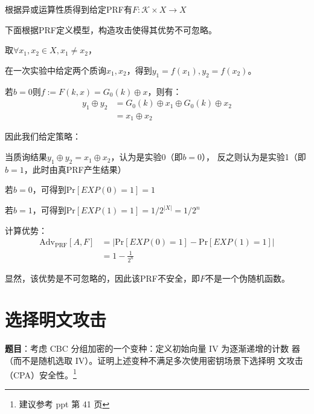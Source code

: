 \begin{Solution}
    根据异或运算性质得到给定PRF有$F:\mathcal{K}\times X \rightarrow X$
    
    下面根据PRF定义模型，构造攻击使得其优势不可忽略。

    取$\forall x_1, x_2 \in X, x_1 \neq x_2$，

    在一次实验中给定两个质询$x_1, x_2$，得到$y_1=f(x_1), y_2=f(x_2)$。

    若$b=0$则$f:=F(k,x) = G_0(k) \oplus x$，则有：
    \begin{equation}
        \begin{aligned}
            y_1 \oplus y_2  &= G_0(k) \oplus x_1 \oplus G_0(k) \oplus x_2\\
                            &= x_1 \oplus x_2
        \end{aligned}
    \end{equation}

    因此我们给定策略：
    
    当质询结果$y_1 \oplus y_2 = x_1 \oplus x_2$，认为是实验0（即$b=0$），
    反之则认为是实验1（即$b=1$，此时由真PRF产生结果）

    若$b=0$，可得到$\mathrm{Pr}[EXP(0)=1] = 1$

    若$b=1$，可得到$\mathrm{Pr}[EXP(1)=1] = 1/2^{|X|} = 1/2^{n}$
    
    计算优势：
    \begin{equation}
        \begin{aligned}
            \mathrm{Adv_{PRF}}[A, F]    &= |\mathrm{Pr}[EXP(0)=1] - \mathrm{Pr}[EXP(1)=1]|\\
                                        &= 1 - \frac{1}{2^n}
        \end{aligned}
    \end{equation}

    显然，该优势是不可忽略的，因此该PRF不安全，即$F$不是一个伪随机函数。
    
\end{Solution}


\newpage
\section{选择明文攻击}

\textbf{题目}：考虑 CBC 分组加密的一个变种：定义初始向量 IV 为逐渐递增的计数
器（而不是随机选取 IV）。证明上述变种不满足多次使用密钥场景下选择明
文攻击（CPA）安全性。\footnote{建议参考 ppt 第 41 页}

